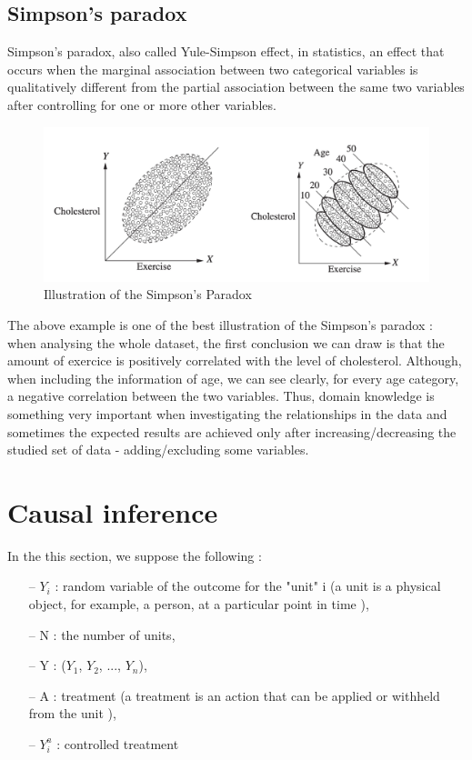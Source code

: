 \documentclass{article}
\begin{document}
 
 \subsection{Simpson's paradox}

Simpson’s paradox, also called Yule-Simpson effect, in statistics, an effect that occurs when the marginal association between two categorical variables is qualitatively different from the partial association between the same two variables after controlling for one or more other variables.

\begin{figure}[h]
\centering
\includegraphics[width=0.7 \textwidth]{../figures/simpson.png}
\caption{Illustration of the Simpson’s Paradox\cite{pearl2016causal}}
\end{figure}

The above example is one of the best illustration of the Simpson's paradox : when analysing the whole dataset, the first conclusion we can draw is that the amount of exercice is positively correlated with the level of cholesterol. Although, when including the information of age, we can see clearly, for every age category, a negative correlation between the two variables. Thus, domain knowledge is something very important when investigating the relationships in the data and sometimes the expected results are achieved only after increasing/decreasing the studied set of data - adding/excluding some variables.

\newpage 

\section{Causal inference}

In the this section, we suppose the following : 

\begin{itemize}
\item[--] $Y_{i}$ : random variable of the outcome for the "unit" i  (a unit is a physical object, for example, a person, at a particular point in time \cite{rubin2005causal}),
\item[--] N : the number of units,
\item[--] Y : ($Y_{1}$, $Y_{2}$, ..., $Y_{n}$),
\item[--] A : treatment (a treatment is an action that can be applied or withheld from the unit \cite{rubin2005causal}),
\item[--] $Y_{i}^{a}$ : controlled treatment 
\end{itemize}
\end{document}
